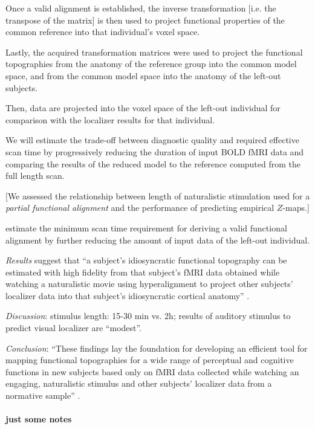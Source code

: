 %
Once a valid alignment is established, the inverse transformation [i.e. the
transpose of the matrix] is then used to project functional properties of the
common reference into that individual's voxel space.

Lastly, the acquired transformation matrices were used to project the functional
topographies from the anatomy of the reference group into the common model
space, and from the common model space into the anatomy of the left-out
subjects.

%
Then, data are projected into the voxel space of the left-out individual for
comparison with the localizer results for that individual.

%
We will estimate the trade-off between diagnostic quality and required effective
scan time by progressively reducing the duration of input BOLD fMRI data and
comparing the results of the reduced model to the reference computed from the
full length scan.

[We assessed the relationship between length of naturalistic stimulation used
for a \textit{partial functional alignment} and the performance of predicting
empirical $Z$-maps.]

%
estimate the minimum scan time requirement for deriving a valid functional
alignment by further reducing the amount of input data of the left-out
individual.

%
\textit{Results} suggest that ``a subject's idiosyncratic functional topography
can be estimated with high fidelity from that subject's fMRI data obtained while
watching a naturalistic movie using hyperalignment to project other subjects’
localizer data into that subject's idiosyncratic cortical anatomy''
\citep{jiahui2020predicting}.

%
\textit{Discussion}: stimulus length: 15-30 min vs. 2h;  results of auditory
stimulus to predict visual localizer are ``modest''.

%
\textit{Conclusion}: ``These findings lay the foundation for developing an
efficient tool for mapping functional topographies for a wide range of
perceptual and cognitive functions in new subjects based only on fMRI data
collected while watching an engaging, naturalistic stimulus and other subjects'
localizer data from a normative sample'' \citep{jiahui2020predicting}.


\paragraph{just some notes}

